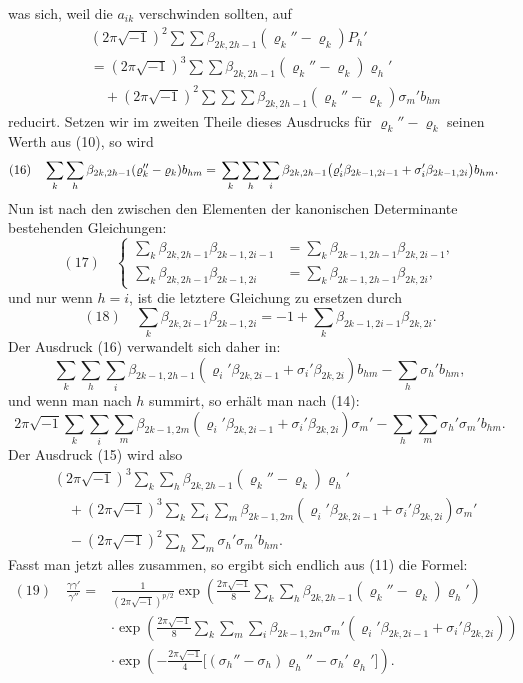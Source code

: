 \documentclass[10pt]{article}
\begin{document}
was sich, weil die \(a_{ik}\) verschwinden sollten, auf
\[
\begin{aligned}
&(2\pi\sqrt{-1})^2\sum\sum\beta_{2k,2h-1}(\varrho_k''-\varrho_k)P_h'\\
&=(2\pi\sqrt{-1})^3\sum\sum\beta_{2k,2h-1}(\varrho_k''-\varrho_k)\varrho_h'\\
&\quad+(2\pi\sqrt{-1})^2\sum\sum\sum\beta_{2k,2h-1}(\varrho_k''-\varrho_k)\sigma_m'b_{hm}
\end{aligned}
\]
reducirt. Setzen wir im zweiten Theile dieses Ausdrucks für \(\varrho_k''-\varrho_k\) seinen Werth aus (10), so wird
\[
\begin{aligned}
(16)\quad
\sum_k\sum_h\beta_{2k,2h-1}(\varrho_k''-\varrho_k)b_{hm}
={}&\sum_k\sum_h\sum_i\beta_{2k,2h-1}\bigl(\varrho_i'\beta_{2k-1,2i-1}\nobreak+\sigma_i'\beta_{2k-1,2i}\bigr)b_{hm}.
\end{aligned}
\]
Nun ist nach den zwischen den Elementen der kanonischen Determinante bestehenden Gleichungen:
\[
(17)\quad
\left\{\begin{aligned}
\sum_k\beta_{2k,2h-1}\beta_{2k-1,2i-1}
&=\sum_k\beta_{2k-1,2h-1}\beta_{2k,2i-1},\\
\sum_k\beta_{2k,2h-1}\beta_{2k-1,2i}
&=\sum_k\beta_{2k-1,2h-1}\beta_{2k,2i},
\end{aligned}\right.
\]
und nur wenn \(h=i\), ist die letztere Gleichung zu ersetzen durch
\[
(18)\quad
\sum_k\beta_{2k,2i-1}\beta_{2k-1,2i}
=-1+\sum_k\beta_{2k-1,2i-1}\beta_{2k,2i}.
\]
Der Ausdruck (16) verwandelt sich daher in:
\[
\sum_k\sum_h\sum_i\beta_{2k-1,2h-1}(\varrho_i'\beta_{2k,2i-1}+\sigma_i'\beta_{2k,2i})b_{hm}
-
\sum_h\sigma_h'b_{hm},
\]
und wenn man nach \(h\) summirt, so erhält man nach (14):
\[
2\pi\sqrt{-1}\sum_k\sum_i\sum_m\beta_{2k-1,2m}(\varrho_i'\beta_{2k,2i-1}+\sigma_i'\beta_{2k,2i})\sigma_m'
-
\sum_h\sum_m\sigma_h'\sigma_m'b_{hm}.
\]
Der Ausdruck (15) wird also
\[
\begin{aligned}
&(2\pi\sqrt{-1})^3\sum_k\sum_h\beta_{2k,2h-1}(\varrho_k''-\varrho_k)\varrho_h'\\
&\quad+(2\pi\sqrt{-1})^3\sum_k\sum_i\sum_m\beta_{2k-1,2m}(\varrho_i'\beta_{2k,2i-1}+\sigma_i'\beta_{2k,2i})\sigma_m'\\
&\quad-(2\pi\sqrt{-1})^2\sum_h\sum_m\sigma_h'\sigma_m'b_{hm}.
\end{aligned}
\]
Fasst man jetzt alles zusammen, so ergibt sich endlich aus (11) die Formel:
\[
\begin{aligned}
(19)\quad
\frac{\gamma\gamma'}{\gamma''}
={}&\frac{1}{(2\pi\sqrt{-1})^{p/2}}
\exp\!\left(\frac{2\pi\sqrt{-1}}{8}\sum_k\sum_h\beta_{2k,2h-1}(\varrho_k''-\varrho_k)\varrho_h'\right)\\
&\cdot\exp\!\left(\frac{2\pi\sqrt{-1}}{8}\sum_k\sum_m\sum_i\beta_{2k-1,2m}\sigma_m'(\varrho_i'\beta_{2k,2i-1}+\sigma_i'\beta_{2k,2i})\right)\\
&\cdot\exp\!\left(-\frac{2\pi\sqrt{-1}}{4}\bigl[(\sigma_h''-\sigma_h)\varrho_h''-\sigma_h'\varrho_h'\bigr]\right).
\end{aligned}
\]
\end{document}
